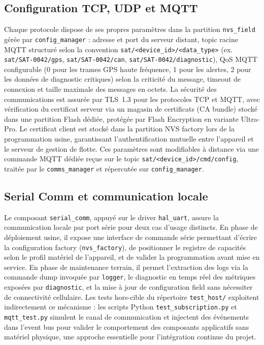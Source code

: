 \subsection{Configuration TCP, UDP et MQTT}
\label{subsec:comms_config}

Chaque protocole dispose de ses propres paramètres dans la partition
\texttt{nvs\_field} gérée par \texttt{config\_manager} : adresse et
port du serveur distant, topic racine MQTT structuré selon la
convention \texttt{sat/<device\_id>/<data\_type>} (ex.
\texttt{sat/SAT-0042/gps}, \texttt{sat/SAT-0042/can},
\texttt{sat/SAT-0042/diagnostic}), QoS MQTT configurable (0 pour les
trames GPS haute fréquence, 1 pour les alertes, 2 pour les données
de diagnostic critiques) selon la criticité du message, timeout de
connexion et taille maximale des messages en octets. La sécurité des
communications est assurée par TLS~1.3 pour les protocoles TCP et
MQTT, avec vérification du certificat serveur via un magasin de
certificats (CA bundle) stocké dans une partition Flash dédiée,
protégée par Flash Encryption en variante Ultra-Pro. Le certificat
client est stocké dans la partition NVS factory lors de la
programmation usine, garantissant l'authentification mutuelle entre
l'appareil et le serveur de gestion de flotte. Ces paramètres sont
modifiables à distance via une commande MQTT dédiée reçue sur le topic
\texttt{sat/<device\_id>/cmd/config}, traitée par le
\texttt{comms\_manager} et répercutée sur \texttt{config\_manager}.

\subsection{Serial Comm et communication locale}
\label{subsec:comms_mocks}

Le composant \texttt{serial\_comm}, appuyé sur le driver
\texttt{hal\_uart}, assure la communication locale par port série
pour deux cas d'usage distincts. En phase de déploiement usine, il
expose une interface de commande série permettant d'écrire la
configuration factory (\texttt{nvs\_factory}), de positionner le
registre de capacités selon le profil matériel de l'appareil, et
de valider la programmation avant mise en service. En phase de
maintenance terrain, il permet l'extraction des logs via la commande
dump invoquée par \texttt{logger}, le diagnostic en temps réel des
métriques exposées par \texttt{diagnostic}, et la mise à jour de
configuration field sans nécessiter de connectivité cellulaire.
Les tests hors-cible du répertoire \texttt{test\_host/} exploitent
indirectement ce mécanisme : les scripts Python
\texttt{test\_subscription.py} et \texttt{mqtt\_test.py} simulent
le canal de communication et injectent des événements dans l'event
bus pour valider le comportement des composants applicatifs sans
matériel physique, une approche essentielle pour l'intégration
continue du projet.

